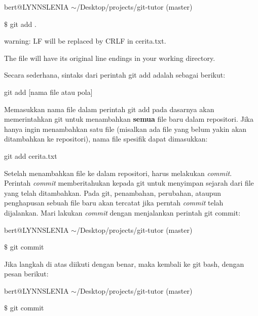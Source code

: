{\fontsize{10pt}{10pt}\selectfont bert@LYNNSLENIA  $  \sim  $/Desktop/projects/git-tutor (master)} \par
{\fontsize{10pt}{10pt}\selectfont  $  \$  $ git add .} \par
{\fontsize{10pt}{10pt}\selectfont warning: LF will be replaced by CRLF in cerita.txt.} \par
{\fontsize{10pt}{10pt}\selectfont The file will have its original line endings in your working directory.} \par
\noindent 
\vspace{12pt}
\noindent 
Secara sederhana, sintaks dari perintah git add adalah sebagai berikut: \par
{\fontsize{10pt}{10pt}\selectfont git add [nama file atau pola]} \par
\noindent 
\vspace{12pt}
\noindent 
 \hspace*{0.64in} Memasukkan nama file dalam perintah git add pada dasarnya akan memerintahkan git untuk menambahkan \textbf{semua} file baru dalam repositori. Jika hanya ingin menambahkan satu file (misalkan ada file yang belum yakin akan ditambahkan ke repositori), nama file spesifik dapat dimasukkan: \par
{\fontsize{10pt}{10pt}\selectfont git add cerita.txt} \par
\noindent 
\vspace{12pt}
Setelah menambahkan file ke dalam repositori, harus melakukan \emph{commit}. Perintah \emph{commit} memberitahukan kepada git untuk menyimpan sejarah dari file yang telah ditambahkan. Pada git, penambahan, perubahan, ataupun penghapusan sebuah file baru akan tercatat jika perntah \emph{commit} telah dijalankan. Mari lakukan \emph{commit} dengan menjalankan perintah git commit: \par
{\fontsize{10pt}{10pt}\selectfont bert@LYNNSLENIA  $  \sim  $/Desktop/projects/git-tutor (master)} \par
{\fontsize{10pt}{10pt}\selectfont  $  \$  $ git commit} \par
\noindent 
\vspace{12pt}
\noindent 
 \hspace*{0.64in} Jika langkah di atas diikuti dengan benar, maka kembali ke {\fontsize{11pt}{11pt}\selectfont git bash, dengan pesan berikut:} \par
{\fontsize{10pt}{10pt}\selectfont bert@LYNNSLENIA  $  \sim  $/Desktop/projects/git-tutor (master)} \par
{\fontsize{10pt}{10pt}\selectfont  $  \$  $ git commit} \par
